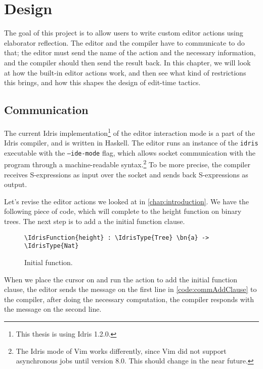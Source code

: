 \chapter{Design}\label{chap:design}
The goal of this project is to allow users to write custom editor actions using
elaborator reflection.
The editor and the compiler have to communicate to do that; the editor must
send the name of the action and the necessary information, and the
compiler should then send the result back.
In this chapter, we will look at how the built-in editor actions work, and then
see what kind of restrictions this brings, and how this shapes the design of
edit-time tactics.

\section{Communication}\label{sec:communication}

The current Idris implementation\footnote{This thesis is using Idris 1.2.0.} of
the editor interaction mode is a part of the Idris compiler, and is written in
Haskell.
The editor runs an instance of the \texttt{idris} executable with the
\texttt{--ide-mode} flag, which
allows socket communication with the program through a machine-readable
syntax.\footnote{The Idris mode of Vim works differently, since Vim did not
support asynchronous jobs until version 8.0. This should change in the near future.}
To be more precise, the compiler receives S-expressions\cite{mccarthy} as input
over the socket and sends back S-expressions as output.

Let's revise the editor actions we looked at in \autoref{chap:introduction}.
We have the following piece of code, which will complete to the height function
on binary trees. The next step is to add a the initial function clause.

\begin{figure}[ht]
\caption{Initial  function.}
\begin{Verbatim}[framesep=2mm, label=\footnotesize{\normalfont{Idris}}, labelposition=topline]
\IdrisFunction{height} : \IdrisType{Tree} \bn{a} -> \IdrisType{Nat}
\end{Verbatim}
\end{figure}

When we place the cursor on  and run the action to add the initial
function clause, the editor sends the message on the first line in
\autoref{code:commAddClause} to the compiler, after doing the necessary
computation, the compiler responds with the message on the second line.

